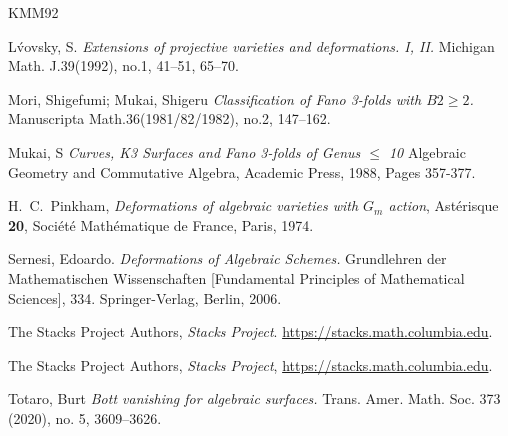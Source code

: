 \documentclass[11pt,twoside]{amsart}
\theoremstyle{plain}
\numberwithin{equation}{section}
\theoremstyle{definition}
\begin{document}
\begin{thebibliography}{KMM92}

L\'vovsky, S.
\emph{Extensions of projective varieties and deformations. I, II.}
Michigan Math. J.39(1992), no.1, 41–51, 65--70.





Mori, Shigefumi; Mukai, Shigeru
\emph{Classification of Fano 3-folds with $B2 \geq 2$.}
Manuscripta Math.36(1981/82/1982), no.2, 147–162.


Mukai, S
\emph{Curves, K3 Surfaces and Fano 3-folds of Genus $\leq$ 10}
Algebraic Geometry and Commutative Algebra, Academic Press,
1988, Pages 357-377.

  \color{black}
  


  \color{black}





H.~C.~Pinkham,
\newblock \emph{Deformations of algebraic varieties with \(G_m\) action},
\newblock Ast\'erisque \textbf{20}, Soci\'et\'e Math\'ematique de France, Paris, 1974.


Sernesi, Edoardo.
\emph{Deformations of Algebraic Schemes.}
Grundlehren der Mathematischen Wissenschaften [Fundamental Principles of Mathematical Sciences], 334. Springer-Verlag, Berlin, 2006.

The Stacks Project Authors,
\emph{Stacks Project}.
\url{https://stacks.math.columbia.edu}.

The Stacks Project Authors,
\emph{Stacks Project},
\url{https://stacks.math.columbia.edu}.

Totaro, Burt
\emph{Bott vanishing for algebraic surfaces.}
Trans. Amer. Math. Soc. 373 (2020), no. 5, 3609–3626.



\end{thebibliography}
\end{document}
